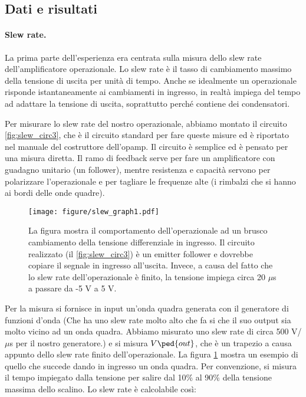 \subsection{Dati e risultati}

\paragraph{Slew rate.}

La prima parte dell'esperienza era centrata sulla misura dello slew rate
dell'amplificatore operazionale. Lo slew rate è il tasso di cambiamento massimo
della tensione di uscita per unità di tempo. Anche se idealmente un operazionale
risponde istantaneamente ai cambiamenti in ingresso, in realtà impiega del tempo
ad adattare la tensione di uscita, soprattutto perché contiene dei condensatori.

Per misurare lo slew rate del nostro operazionale, abbiamo montato il circuito
\ref{fig:slew_circ3}, che è il circuito standard per fare queste misure ed
è riportato nel manuale del costruttore dell'opamp. Il circuito è semplice ed è pensato
per una misura diretta. Il ramo di feedback serve per fare un amplificatore 
con guadagno unitario (un follower), mentre resistenza e capacità servono per polarizzare
l'operazionale e per tagliare le frequenze alte (i rimbalzi che si hanno ai bordi delle onde quadre).

\begin{figure}[t!]
    \texttt{[image: figure/slew\_graph1.pdf]}
    \caption{La figura mostra il comportamento dell'operazionale ad un brusco cambiamento della tensione
        differenziale in ingresso. Il circuito realizzato (il \ref{fig:slew_circ3}) è un emitter follower
        e dovrebbe copiare il segnale in ingresso all'uscita. Invece, a causa del fatto che lo slew rate
        dell'operazionale è finito, la tensione impiega circa 20 $\mu$s a passare da -5 V a 5 V.}
    \label{fig:slew_graph3}
\end{figure}

Per la misura si fornisce in input un'onda quadra generata con il generatore
di funzioni d'onda (Che ha uno slew rate molto alto che fa si che il suo output sia
molto vicino ad un onda quadra. Abbiamo misurato uno slew rate di circa 500 V/$\mu$s per
il nostro generatore.) e si misura $V\ped{out}$, che è un trapezio a causa appunto dello
slew rate finito dell'operazionale. La figura  \ref{fig:slew_graph3} mostra un esempio
di quello che succede dando in ingresso un onda quadra.
Per convenzione, si misura il tempo impiegato
dalla tensione per salire dal 10\% al 90\% della tensione massima dello scalino.
Lo slew rate è calcolabile così:

